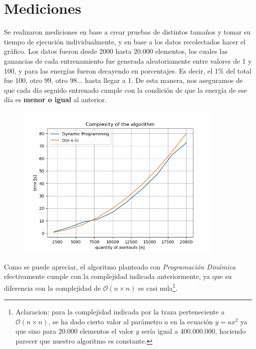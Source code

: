 \section{Mediciones}

Se realizaron mediciones en base a crear pruebas de distintos tamaños y tomar su tiempo de ejecución individualmente, y en base a los datos recolectados hacer el gráfico. Los datos fueron desde 2000 hasta 20.000 elementos, los cuales las ganancias de cada entrenamiento fue generada aleatoriamente entre valores de 1 y 100, y para las energías fueron decayendo en porcentajes. Es decir, el 1\% del total fue 100, otro 99, otro 98... hasta llegar a 1. De esta manera, nos aseguramos de que cada día seguido entrenado cumple con la condición de que la energía de ese día es \textbf{menor o igual} al anterior.

\begin{figure}[H]
	\centering
	\includegraphics[width=0.9\textwidth]{img/graphic.png}
\end{figure}

Como se puede apreciar, el algoritmo planteado con \textit{Programación Dinámica} efectivamente cumple con la complejidad indicada anteriormente, ya que su diferencia con la complejidad de $\mathcal{O}(n \times n)$ es casi nula\footnote{Aclaracion: para la complejidad indicada por la traza perteneciente a $\mathcal{O}(n \times n)$, se ha dado cierto valor al parámetro $a$ en la ecuación $y=ax^2$ ya que sino para 20.000 elementos el valor $y$ sería igual a 400.000.000, haciendo parecer que nuestro algoritmo es constante.}.
